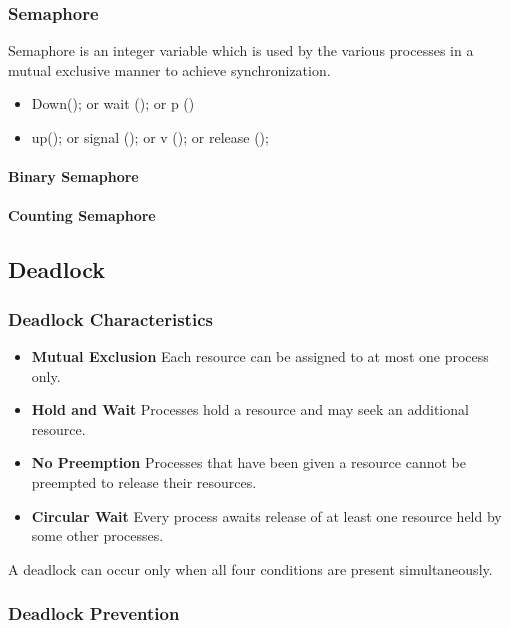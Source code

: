 \subsubsection{Semaphore}
Semaphore is an integer variable which is used by the various processes in a mutual exclusive manner to achieve synchronization.
\begin{itemize}
    \item Down(); or wait (); or p ()
    \item up(); or signal (); or v (); or release ();
\end{itemize}
\paragraph{Binary Semaphore}
\paragraph{Counting Semaphore}

\subsection{Deadlock}
\subsubsection{Deadlock Characteristics}
\begin{itemize}
	\item \textbf{Mutual Exclusion} Each resource can be assigned to at most one process only.
	\item \textbf{Hold and Wait} Processes hold a resource and may seek an additional resource.
	\item \textbf{No Preemption} Processes that have been given a resource cannot be preempted to release their resources.
	\item \textbf{Circular Wait} Every process awaits release of at least one resource held by some other processes.
\end{itemize}

A deadlock can occur only when all four conditions are present simultaneously.
\subsubsection{Deadlock Prevention}
